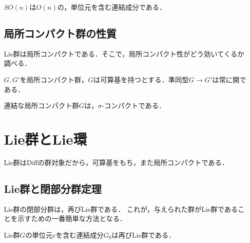 \documentclass[uplatex,dvipdfmx]{jsreport}
\begin{document}
\begin{proposition}
    $SO(n)$は$O(n)$の，単位元を含む連結成分である．
\end{proposition}

\subsection{局所コンパクト群の性質}

\begin{tcolorbox}[colframe=ForestGreen, colback=ForestGreen!10!white,breakable,colbacktitle=ForestGreen!40!white,coltitle=black,fonttitle=\bfseries\sffamily,
title=]
    Lie群は局所コンパクトである．そこで，局所コンパクト性がどう効いてくるか調べる．
\end{tcolorbox}

\begin{theorem}
    $G,G'$を局所コンパクト群，$G$は可算基を持つとする．準同型$G\to G'$は常に開である．
\end{theorem}

\begin{theorem}
    連結な局所コンパクト群$G$は，$\sigma$-コンパクトである．
\end{theorem}

\section{Lie群とLie環}

\begin{tcolorbox}[colframe=ForestGreen, colback=ForestGreen!10!white,breakable,colbacktitle=ForestGreen!40!white,coltitle=black,fonttitle=\bfseries\sffamily,
title=]
    Lie群はDiffの群対象だから，可算基をもち，また局所コンパクトである．
\end{tcolorbox}

\subsection{Lie群と閉部分群定理}

\begin{tcolorbox}[colframe=ForestGreen, colback=ForestGreen!10!white,breakable,colbacktitle=ForestGreen!40!white,coltitle=black,fonttitle=\bfseries\sffamily,
    title=]
    Lie群の閉部分群は，再びLie群である．
    これが，与えられた群がLie群であることを示すための一番簡単な方法となる．
\end{tcolorbox}

\begin{lemma}
    Lie群$G$の単位元$e$を含む連結成分$G_0$は再びLie群である．
\end{lemma}
\end{document}
